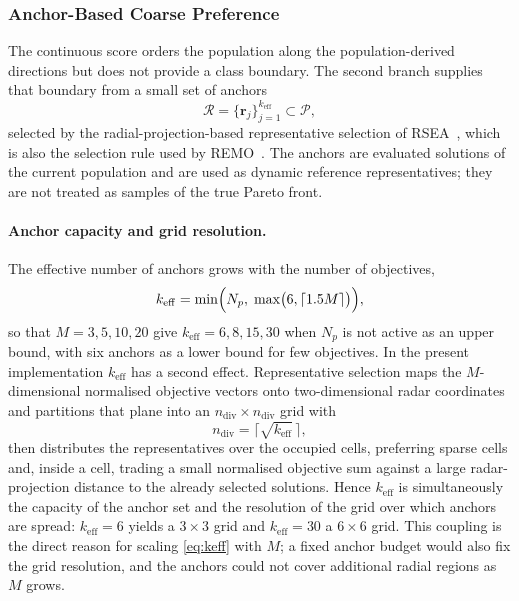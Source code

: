 \documentclass[11pt,a4paper]{article}
\newcommand{\vr}{\mathbf{r}}
\newcommand{\keff}{k_{\mathrm{eff}}}
\begin{document}
\subsubsection{Anchor-Based Coarse Preference}
\label{sec:method:hpc:anchor}

The continuous score orders the population along the population-derived
directions but does not provide a class boundary. The second branch supplies
that boundary from a small set of anchors
\begin{equation}
\mathcal{R}=\{\vr_j\}_{j=1}^{\keff}\subset\mathcal{P},
\label{eq:anchors}
\end{equation}
selected by the radial-projection-based representative selection of
RSEA~\cite{ref:rsea}, which is also the selection rule used by
REMO~\cite{ref:remo}. The anchors are evaluated solutions of the current
population and are used as dynamic reference representatives; they are not
treated as samples of the true Pareto front.

\paragraph{Anchor capacity and grid resolution.}
The effective number of anchors grows with the number of objectives,
\begin{equation}
\keff=\min\Bigl(N_p,\;\max\bigl(6,\lceil1.5M\rceil\bigr)\Bigr),
\label{eq:keff}
\end{equation}
so that $M=3,5,10,20$ give $\keff=6,8,15,30$ when $N_p$ is not active as an
upper bound, with six anchors as a lower bound for few objectives. In the
present implementation $\keff$ has a second effect. Representative selection
maps the $M$-dimensional normalised objective vectors onto two-dimensional
radar coordinates and partitions that plane into an
$n_{\mathrm{div}}\times n_{\mathrm{div}}$ grid with
\begin{equation}
n_{\mathrm{div}}=\bigl\lceil\sqrt{\keff}\,\bigr\rceil ,
\label{eq:ndiv}
\end{equation}
then distributes the representatives over the occupied cells, preferring sparse
cells and, inside a cell, trading a small normalised objective sum against a
large radar-projection distance to the already selected solutions. Hence
$\keff$ is simultaneously the capacity of the anchor set and the resolution of
the grid over which anchors are spread: $\keff=6$ yields a $3\times3$ grid and
$\keff=30$ a $6\times6$ grid. This coupling is the direct reason for scaling
\eqref{eq:keff} with $M$; a fixed anchor budget would also fix the grid
resolution, and the anchors could not cover additional radial regions as $M$
grows.
\end{document}
